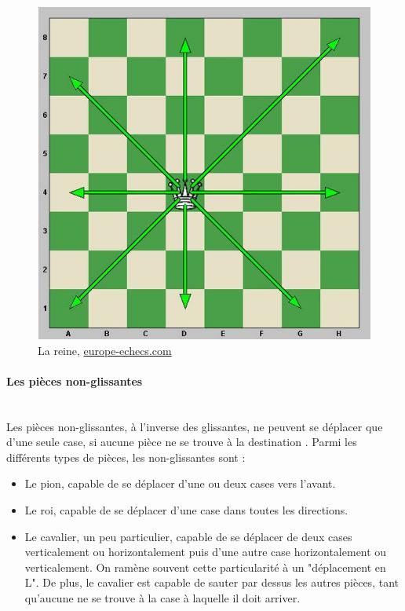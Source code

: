 \huge\documentclass{article}
\begin{document}
    \newpage

    \begin{figure}[h]
        \centering
        \includegraphics[scale=0.5]{img/mouvements_reine.jpg}
        \caption{La reine,
            \href{https://www.europe-echecs.com/art/2-le-deplacement-des-pieces-93.html}{europe-echecs.com}}
    \end{figure}

    \paragraph{Les pièces non-glissantes}
    ~~\\
    Les pièces non-glissantes, à l'inverse des glissantes, ne peuvent se déplacer que d'une seule case, si aucune pièce ne se trouve à la destination . Parmi les différents types de pièces, les non-glissantes sont :

    \begin{itemize}
        \item Le pion, capable de se déplacer d'une ou deux cases vers l'avant.
        \item Le roi, capable de se déplacer d'une case dans toutes les directions.
        \item Le cavalier, un peu particulier, capable de se déplacer de deux cases verticalement ou horizontalement puis d'une autre case horizontalement ou verticalement. On ramène souvent cette particularité à un "déplacement en L". De plus, le cavalier est capable de sauter par dessus les autres pièces, tant qu'aucune ne se trouve à la case à laquelle il doit arriver.
    \end{itemize}
\end{document}
